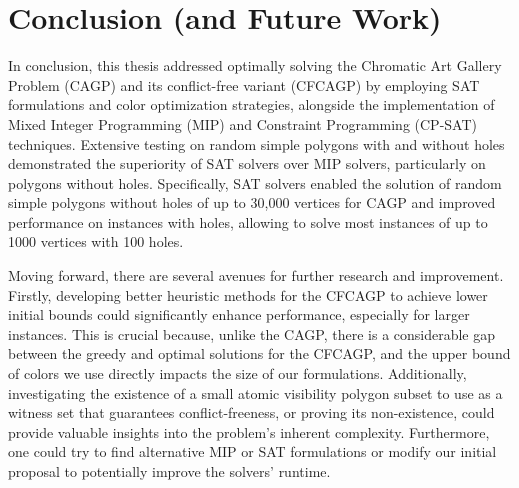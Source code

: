 \chapter{Conclusion (and Future Work)}\label{ch:conclusion}

In conclusion, this thesis addressed optimally solving the Chromatic Art Gallery Problem (CAGP) and its conflict-free variant (CFCAGP) by employing SAT formulations and color optimization strategies, alongside the implementation of Mixed Integer Programming (MIP) and Constraint Programming (CP-SAT) techniques. Extensive testing on random simple polygons with and without holes demonstrated the superiority of SAT solvers over MIP solvers, particularly on polygons without holes. Specifically, SAT solvers enabled the solution of random simple polygons without holes of up to 30,000 vertices for CAGP and improved performance on instances with holes, allowing to solve most instances of up to 1000 vertices with 100 holes.

Moving forward, there are several avenues for further research and improvement. Firstly, developing better heuristic methods for the CFCAGP to achieve lower initial bounds could significantly enhance performance, especially for larger instances. This is crucial because, unlike the CAGP, there is a considerable gap between the greedy and optimal solutions for the CFCAGP, and the upper bound of colors we use directly impacts the size of our formulations. Additionally, investigating the existence of a small atomic visibility polygon subset to use as a witness set that guarantees conflict-freeness, or proving its non-existence, could provide valuable insights into the problem's inherent complexity. Furthermore, one could try to find alternative MIP or SAT formulations or modify our initial proposal to potentially improve the solvers' runtime.





